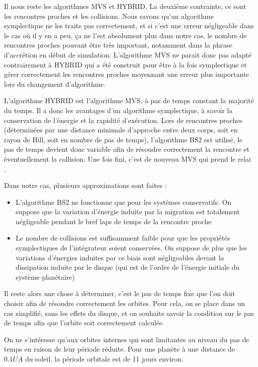 Il nous reste les algorithmes MVS et HYBRID. La deuxième contrainte, ce sont les rencontres proches et les collisions. Nous savons qu'un algorithme symplectique ne les traite pas correctement, et si c'est une erreur négligeable dans le cas où il y en a peu, ça ne l'est absolument plus dans notre cas, le nombre de rencontres proches pouvant être très important, notamment dans la phrase d'accrétion en début de simulation. L'algorithme MVS ne parait donc pas adapté contrairement à HYBRID qui a été construit pour être à la fois symplectique et gérer correctement les rencontres proches moyennant une erreur plus importante lors du changement d'algorithme. 

L'algorithme HYBRID est l'algorithme MVS, à pas de temps constant la majorité du temps. Il a donc les avantages d'un algorithme symplectique, à savoir la conservation de l'énergie et la rapidité d'exécution. Lors de rencontres proches (déterminées par une distance minimale d'approche entre deux corps, soit en rayon de Hill, soit en nombre de pas de temps), l'algorithme BS2 est utilisé, le pas de temps devient donc variable afin de résoudre correctement la rencontre et éventuellement la collision. Une fois fini, c'est de nouveau MVS qui prend le relai \citep[voir aussi ][]{mcneil2009new}. 

Dans notre cas, plusieurs approximations sont faites : 
\begin{itemize}
\item L'algorithme BS2 ne fonctionne que pour les systèmes conservatifs. On suppose que la variation d'énergie induite par la migration est totalement négligeable pendant le bref laps de temps de la rencontre proche
\item Le nombre de collisions est suffisamment faible pour que les propriétés symplectiques de l'intégrateur soient conservées. On suppose de plus que les variations d'énergies induites par ce biais sont négligeables devant la dissipation induite par le disque (qui est de l'ordre de l'énergie initiale du système planétaire)
\end{itemize}

Il reste alors une chose à déterminer, c'est le pas de temps fixe que l'on doit choisir afin de résoudre correctement les orbites. Pour cela, on se place dans un cas simplifié, sans les effets du disque, et on souhaite savoir la condition sur le pas de temps afin que l'orbite soit correctement calculée. 

On ne s'intéresse qu'aux orbites internes qui sont limitantes au niveau du pas de temps en raison de leur période réduite. Pour une planète à une distance de $0.1\unit{UA}$ du soleil, la période orbitale est de 11 jours environ.

